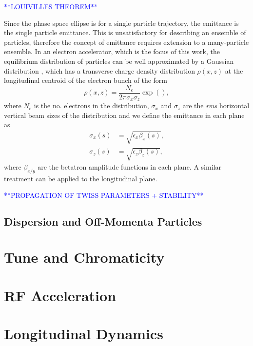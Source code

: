 \documentclass[../main.tex]{subfiles}
\begin{document}
\textcolor{blue}{**LOUIVILLES THEOREM**}

Since the phase space ellipse is for a single particle trajectory, the emittance is the single particle emittance. This is unsatisfactory for describing an ensemble of particles, therefore the concept of emittance requires extension to a many-particle ensemble. In an electron accelerator, which is the focus of this work, the equilibrium distribution of particles can be well approximated by a Gaussian distribution \cite{}, which has a transverse charge density distribution $\rho\left(x,z\right)$ at the longitudinal centroid of the electron bunch of the form
\begin{equation}
\rho\left(x,z\right) = \frac{N_{e}}{2\pi\sigma_{x}\sigma_{z}}\exp\left(\right),
\label{eq:Gaussian_transverse_charge_distribution}    
\end{equation}
where $N_{e}$ is the no. electrons in the distribution, $\sigma_{x}$ and $\sigma_{z}$ are the \textit{rms} horizontal vertical beam sizes of the distribution and we define the emittance in each plane as
\begin{align}
\sigma_{x}\left(s\right) &= \sqrt{\epsilon_{x}\beta_{x}\left(s\right)}, 
\label{eq:horizontal_emittance} \\
\sigma_{z}\left(s\right) &= \sqrt{\epsilon_{z}\beta_{z}\left(s\right)},
\label{eq:vertical_emittance}
\end{align}
where $\beta_{x/y}$ are the betatron amplitude functions in each plane. A similar treatment can be applied to the longitudinal plane.

\textcolor{blue}{**PROPAGATION OF TWISS PARAMETERS + STABILITY**}

\subsection{Dispersion and Off-Momenta Particles} 

\section{Tune and Chromaticity}

\section{RF Acceleration}

\section{Longitudinal Dynamics}
\end{document}
